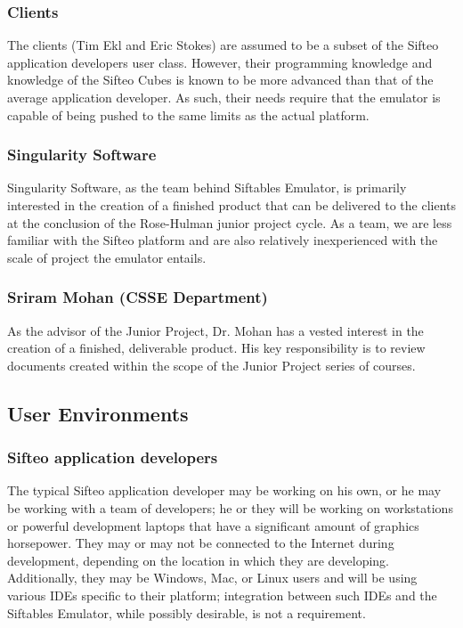 \documentclass[12pt]{article}
\begin{document}
                          \subsubsection{Clients}
                          The clients (Tim Ekl and Eric Stokes) are assumed to be a subset of the Sifteo application developers user class. However, their programming knowledge and knowledge of the Sifteo Cubes is known to be more advanced than that of the average application developer. As such, their needs require that the emulator is capable of being pushed to the same limits as the actual platform.

                          \subsubsection{Singularity Software}
                          Singularity Software, as the team behind Siftables Emulator, is primarily interested in the creation of a finished product that can be delivered to the clients at the conclusion of the Rose-Hulman junior project cycle. As a team, we are less familiar with the Sifteo platform and are also relatively inexperienced with the scale of project the emulator entails.

                          \subsubsection{Sriram Mohan (CSSE Department)}
                          As the advisor of the Junior Project, Dr. Mohan has a vested interest in the creation of a finished, deliverable product. His key responsibility is to review documents created within the scope of the Junior Project series of courses.

               \subsection{User Environments}

                          \subsubsection{Sifteo application developers}
                          The typical Sifteo application developer may be working on his own, or he may be working with a team of developers; he or they will be working on workstations or powerful development laptops that have a significant amount of graphics horsepower. They may or may not be connected to the Internet during development, depending on the location in which they are developing. Additionally, they may be \gls{Windows}, \gls{Mac}, or \gls{Linux} users and will be using various \glspl{IDE} specific to their platform; integration between such \glspl{IDE} and the Siftables Emulator, while possibly desirable, is not a requirement.
\end{document}
